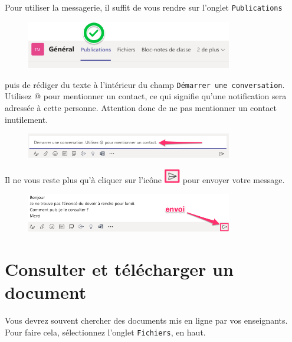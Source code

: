 Pour utiliser la messagerie, il suffit de vous rendre sur l'onglet \texttt{Publications}

\begin{figure}[H]
\includegraphics[width=9cm]{./images/teams/publications}
\centering
\end{figure}

puis de rédiger du texte à l'intérieur du champ \texttt{Démarrer une conversation}. Utilisez @ pour mentionner un contact, ce qui signifie qu'une notification sera adressée à cette personne. Attention donc de ne pas mentionner un contact inutilement.

\begin{figure}[H]
\includegraphics[width=9cm]{./images/teams/publications2}
\centering
\end{figure}

Il ne vous reste plus qu'à cliquer sur l'icône \includegraphics[width=0.7cm]{./images/teams/envoi_message} pour envoyer votre message.

\begin{figure}[H]
\includegraphics[width=9cm]{./images/teams/publications3}
\centering
\end{figure}





\section{Consulter et télécharger un document}

Vous devrez souvent chercher des documents mis en ligne par vos enseignants. Pour faire cela, sélectionnez l'onglet \texttt{Fichiers}, en haut.

